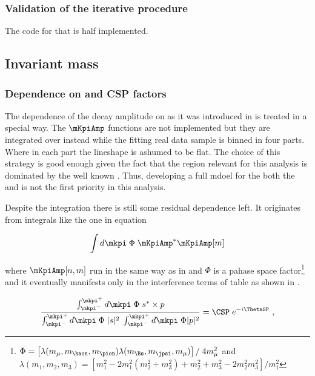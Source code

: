 \subsubsection{Validation of the iterative procedure}
{\color{red} The code for that is half implemented.}

\subsection{\Kpi Invariant mass}
\label{Kpi_Invariant_mass}

\subsubsection{Dependence on \mkpi and CSP factors}
The dependence of the \BJpsiKpi decay amplitude on \mkpi as it was introduced in  is treated in a special way.
The $\mKpiAmp$ functions are not implemented but they are integrated over \mkpi instead while the fitting real data sample is binned in four parts.
Where in each part the \mkpi lineshape is ashumed to be flat.
The choice of this strategy is good enough given the fact that the \mkpi region relevant for this analysis is dominated by the well
known \pwave. Thus, developing a full mdoel for the both the \pwave and \swave is not the first priority in this analysis.

Despite the \mkpi integration there is still some residual dependence left. It originates from integrals
like the one in equation 

\begin{equation}
  \label{spIntegrals}
  \int d\mkpi \; \Phi \; \mKpiAmp^* \mKpiAmp[m]
\end{equation}

\noindent where $\mKpiAmp[n,m]$ run in the same way as in  and $\Phi$ is a pahase space 
factor\footnote{$\Phi = \left[ \lambda(m_\mu,m_\kaon,m_\pion) \lambda(m_{\Bs},m_\jpsi,m_\mu) \right] / \; 4 m_\mu^2$  and \\ 
$\lambda(m_1,m_2,m_3) = \left[ m_1^2 - 2m_1^2(m_2^2 + m_3^2) + m_2^2 + m_3^2 - 2m_2^2m_3^2 \right] / m_1^2 $  
} and it eventually manifests only in the \spwave interference terms of table  as shown
in .

\begin{equation}
  \label{csp_def}
  \frac{\int_{\mkpi^-}^{\mkpi^+} d\mkpi \; \Phi \; s^* \times p} {\int_{\mkpi^-}^{\mkpi^+} d\mkpi \; \Phi \; |s|^2 \; \int_{\mkpi^-}^{\mkpi^+} d\mkpi \; \Phi |p|^2} = \CSP \; e^{-i\ThetaSP} \ ,
\end{equation}

